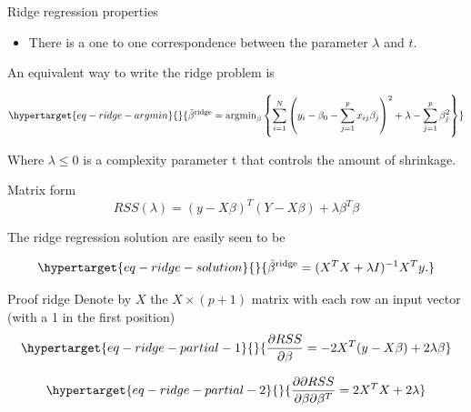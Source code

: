 \documentclass[
  ignorenonframetext,
  aspectratio=32,
]{beamer}
\providecommand{\tightlist}{%
  \setlength{\itemsep}{0pt}\setlength{\parskip}{0pt}}\usepackage{longtable,booktabs,array}
\begin{document}
\begin{frame}{Ridge regression properties}
\protect\hypertarget{ridge-regression-properties}{}
\begin{itemize}
\tightlist
\item
  There is a one to one correspondence between the parameter \(\lambda\)
  and \(t\).
\end{itemize}

An equivalent way to write the ridge problem is

\begin{equation}\protect\hypertarget{eq-ridge-argmin}{}{
\hat{\beta}^{\text{ridge}}
= 
\text{argmin}_\beta
\left\{
    \sum_{i = 1}^N
    \left(
        y_i - \beta_0 
        - \sum_{j = 1}^p
        x_{i j} \beta_j
    \right)^2
    + 
    \lambda
    - \sum_{j = 1}^p  \beta_j^2
\right\}
}\label{eq-ridge-argmin}\end{equation}

Where \(\lambda \leq 0\) is a complexity parameter t that controls the
amount of shrinkage.
\end{frame}

\begin{frame}{Matrix form}
\protect\hypertarget{matrix-form}{}
\[
RSS(\lambda) 
= 
(y - X \beta)^T
(Y - X \beta )
+ \lambda \beta^T \beta
\]

The ridge regression solution are easily seen to be

\begin{equation}\protect\hypertarget{eq-ridge-solution}{}{
\hat{\beta}^{\text{ridge}}
 = 
 (X^T X + \lambda I)^{-1}
 X^T y.
}\label{eq-ridge-solution}\end{equation}
\end{frame}

\begin{frame}{Proof ridge}
\protect\hypertarget{proof-ridge}{}
Denote by \(X\) the \(X \times (p+1)\) matrix with each row an input
vector (with a 1 in the first position)
\begin{equation}\protect\hypertarget{eq-ridge-partial-1}{}{
\frac{\partial RSS}{\partial \beta}
= 
-2X^T (y - X \beta) + 2 \lambda \beta
}\label{eq-ridge-partial-1}\end{equation}

\begin{equation}\protect\hypertarget{eq-ridge-partial-2}{}{
\frac{\partial \partial RSS}{\partial \beta \partial \beta^T}
= 
2X^T X + 2 \lambda
}\label{eq-ridge-partial-2}\end{equation}
\end{frame}
\end{document}
